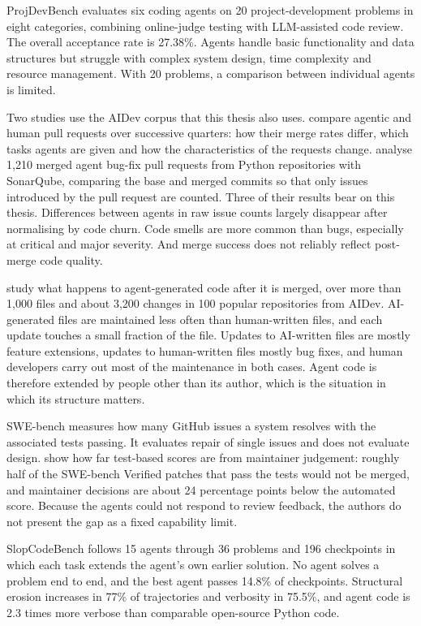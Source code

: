 ProjDevBench \citep{lu2026projdevbench} evaluates six coding agents on 20 project-development
problems in eight categories, combining online-judge testing with LLM-assisted code review. The
overall acceptance rate is 27.38\%. Agents handle basic functionality and data structures but
struggle with complex system design, time complexity and resource management. With 20 problems, a
comparison between individual agents is limited.

Two studies use the AIDev corpus that this thesis also uses. \citet{mazloomzadeh2026agentic}
compare agentic and human pull requests over successive quarters: how their merge rates differ, which
tasks agents are given and how the characteristics of the requests change. \citet{cynthia2026postmerge}
analyse 1,210 merged agent bug-fix pull requests from Python repositories with SonarQube, comparing
the base and merged commits so that only issues introduced by the pull request are counted. Three of
their results bear on this thesis. Differences between agents in raw issue counts largely disappear
after normalising by code churn. Code smells are more common than bugs, especially at critical and
major severity. And merge success does not reliably reflect post-merge code quality.

\citet{sawada2026maintenance} study what happens to agent-generated code after it is merged, over
more than 1,000 files and about 3,200 changes in 100 popular repositories from AIDev. AI-generated
files are maintained less often than human-written files, and each update touches a small fraction
of the file. Updates to AI-written files are mostly feature extensions, updates to human-written
files mostly bug fixes, and human developers carry out most of the maintenance in both cases. Agent
code is therefore extended by people other than its author, which is the situation in which its
structure matters.

SWE-bench \citep{jimenez2024swebench} measures how many GitHub issues a system resolves with the
associated tests passing. It evaluates repair of single issues and does not evaluate design.
\citet{metr2026sweverified} show how far test-based scores are from maintainer judgement: roughly
half of the SWE-bench Verified patches that pass the tests would not be merged, and maintainer
decisions are about 24 percentage points below the automated score. Because the agents could not
respond to review feedback, the authors do not present the gap as a fixed capability limit.

SlopCodeBench \citep{slopcodebench2026} follows 15 agents through 36 problems and 196 checkpoints
in which each task extends the agent's own earlier solution. No agent solves a problem end to end,
and the best agent passes 14.8\% of checkpoints. Structural erosion increases in 77\% of
trajectories and verbosity in 75.5\%, and agent code is 2.3 times more verbose than comparable
open-source Python code.


